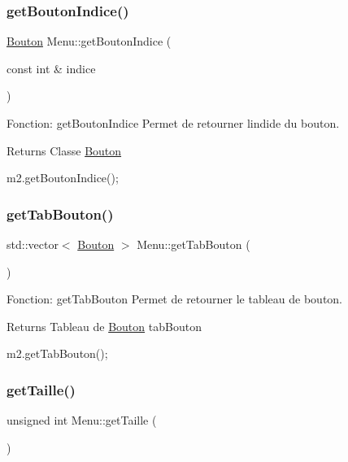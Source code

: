 \subsubsection{\texorpdfstring{get\+Bouton\+Indice()}{getBoutonIndice()}}
{\footnotesize\ttfamily \hyperlink{classBouton}{Bouton} Menu\+::get\+Bouton\+Indice (\begin{DoxyParamCaption}\item[{const int \&}]{indice }\end{DoxyParamCaption})}



Fonction\+: get\+Bouton\+Indice Permet de retourner l\textquotesingle{}indide du bouton. 

\begin{DoxyReturn}{Returns}
Classe \hyperlink{classBouton}{Bouton} 
\begin{DoxyCode}
m2.getBoutonIndice();
\end{DoxyCode}
 
\end{DoxyReturn}
\mbox{\label{classMenu_a6d80af8bd800d44072ddb63a80b911cd}} 
\subsubsection{\texorpdfstring{get\+Tab\+Bouton()}{getTabBouton()}}
{\footnotesize\ttfamily std\+::vector$<$ \hyperlink{classBouton}{Bouton} $>$ Menu\+::get\+Tab\+Bouton (\begin{DoxyParamCaption}{ }\end{DoxyParamCaption})}



Fonction\+: get\+Tab\+Bouton Permet de retourner le tableau de bouton. 

\begin{DoxyReturn}{Returns}
Tableau de \hyperlink{classBouton}{Bouton} tab\+Bouton 
\begin{DoxyCode}
m2.getTabBouton();
\end{DoxyCode}
 
\end{DoxyReturn}
\mbox{\label{classMenu_a0a114609fcaf58b130a44a14e341117e}} 
\subsubsection{\texorpdfstring{get\+Taille()}{getTaille()}}
{\footnotesize\ttfamily unsigned int Menu\+::get\+Taille (\begin{DoxyParamCaption}{ }\end{DoxyParamCaption})}



